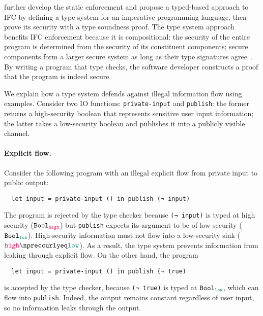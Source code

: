 \textcite{volpano1996sound} further develop the static enforcement and propose a
typed-based approach to IFC by defining a type system for an imperative
programming language, then prove its security with a type soundness proof. The
type system approach benefits IFC enforcement because it is compositional: the
security of the entire program is determined from the security of its
constituent components; secure components form a larger secure system as long as
their type signatures agree~\cite{sabelfeld2003language}. By writing a program
that type checks, the software developer constructs a proof that the program is
indeed secure.

We explain how a type system defends against illegal information flow using
examples. Consider two IO functions: \texttt{private-input} and
\texttt{publish}: the former returns a high-security boolean that represents
sensitive user input information; the latter takes a low-security boolean and
publishes it into a publicly visible channel.

\paragraph{Explicit flow.} Consider the following program with an illegal explicit flow
from private input to public output:
\begin{verbatim}
  let input = private-input () in publish (¬ input)
\end{verbatim}
The program is rejected by the type checker because \texttt{(¬ input)} is typed
at high security ($\Bool_{\high}$) but \texttt{publish} expects its argument to
be of low security ($\Bool_{\low}$). High-security information must not flow
into a low-security sink ($\high \npreccurlyeq \low$). As a result, the type
system prevents information from leaking through explicit flow. On the other
hand, the program
\begin{verbatim}
  let input = private-input () in publish (¬ true)
\end{verbatim}
is accepted by the type checker, because \texttt{(¬ true)} is typed at
$\Bool_{\low}$, which can flow into \texttt{publish}. Indeed, the output remains
constant regardless of user input, so no information leaks through the output.

